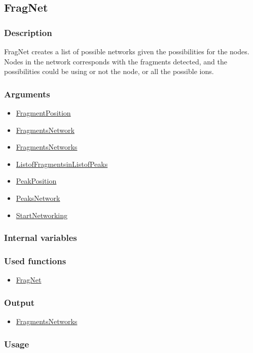 \subsection{FragNet}\label{FragNet}
\subsubsection{Description}
FragNet creates a list of possible networks given the possibilities for the nodes. Nodes in the network corresponds with the fragments detected, and the possibilities could be using or not the node, or all the possible ions. 
\subsubsection{Arguments}
\begin{itemize}
\item \hyperref[FragmentPosition]{FragmentPosition}
\item \hyperref[FragmentsNetwork]{FragmentsNetwork} 
\item \hyperref[FragmentsNetworks]{FragmentsNetworks}
\item \hyperref[ListofFragmentsinListofPeaks]{ListofFragmentsinListofPeaks}
\item \hyperref[PeakPosition]{PeakPosition}
\item \hyperref[PeaksNetwork]{PeaksNetwork}
\item \hyperref[StartNetworking]{StartNetworking}
\end{itemize}
\subsubsection{Internal variables}
\subsubsection{Used functions}
\begin{itemize}
\item \hyperref[FragNet]{FragNet}
\end{itemize}
\subsubsection{Output}
\begin{itemize}
\item \hyperref[FragmentsNetworks]{FragmentsNetworks}
\end{itemize}
\subsubsection{Usage}



